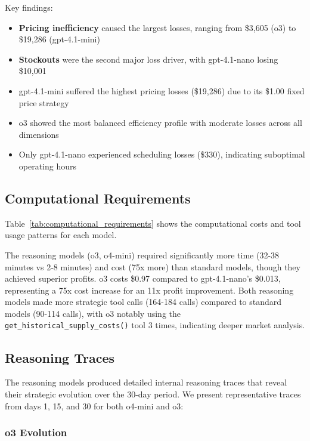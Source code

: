 \documentclass[11pt]{article}
\begin{document}
Key findings:
\begin{itemize}
    \item \textbf{Pricing inefficiency} caused the largest losses, ranging from \$3,605 (o3) to \$19,286 (gpt-4.1-mini)
    \item \textbf{Stockouts} were the second major loss driver, with gpt-4.1-nano losing \$10,001
    \item gpt-4.1-mini suffered the highest pricing losses (\$19,286) due to its \$1.00 fixed price strategy
    \item o3 showed the most balanced efficiency profile with moderate losses across all dimensions
    \item Only gpt-4.1-nano experienced scheduling losses (\$330), indicating suboptimal operating hours
\end{itemize}

\subsection{Computational Requirements}

Table~\ref{tab:computational_requirements} shows the computational costs and tool usage patterns for each model.



The reasoning models (o3, o4-mini) required significantly more time (32-38 minutes vs 2-8 minutes) and cost (75x more) than standard models, though they achieved superior profits. o3 costs \$0.97 compared to gpt-4.1-nano's \$0.013, representing a 75x cost increase for an 11x profit improvement. Both reasoning models made more strategic tool calls (164-184 calls) compared to standard models (90-114 calls), with o3 notably using the \texttt{get\_historical\_supply\_costs()} tool 3 times, indicating deeper market analysis.

\subsection{Reasoning Traces}

The reasoning models produced detailed internal reasoning traces that reveal their strategic evolution over the 30-day period. We present representative traces from days 1, 15, and 30 for both o4-mini and o3:

\subsubsection{o3 Evolution}
\end{document}
